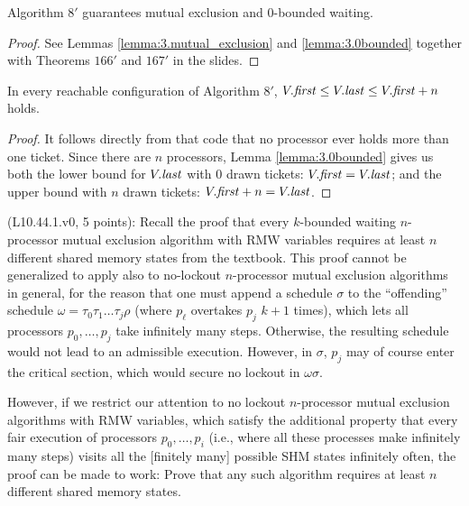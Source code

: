 
\begin{theorem}
Algorithm $8'$ guarantees mutual exclusion and 0-bounded waiting.
\end{theorem}

\begin{proof}
See Lemmas \ref{lemma:3.mutual_exclusion} and \ref{lemma:3.0bounded} together with
Theorems $166'$ and $167'$ in the slides.
\end{proof}


\begin{lemma} \label{lemma:3.Vbounds}
In every reachable configuration of Algorithm $8'$,
$V.\mathit{first} \leq V.\mathit{last} \leq V.\mathit{first}+n$ holds.
\end{lemma}

\begin{proof}
It follows directly from that code that no processor ever holds more than one
ticket. Since there are $n$ processors, Lemma \ref{lemma:3.0bounded} gives us
both the lower bound for $V.\mathit{last}$ with $0$ drawn tickets: $V.\mathit{first} = V.\mathit{last}$;
and the upper bound with $n$ drawn tickets: $V.\mathit{first} + n = V.\mathit{last}$.
\end{proof}



\begin{Exc}{(L10.44.1.v0, 5 points):}
Recall the proof that every $k$-bounded waiting $n$-processor mutual exclusion
algorithm with RMW variables requires at least $n$ different shared
memory states from the textbook. This proof cannot be generalized to apply also to no-lockout
$n$-processor mutual exclusion algorithms in general, for the reason that one must
append a schedule $\sigma$ to the ``offending'' schedule $\omega=\tau_0\tau_1\dots\tau_j\rho$
(where $p_{\ell}$ overtakes $p_j$ $k+1$ times), which lets all processors
$p_0,\dots,p_j$ take infinitely many steps. Otherwise, the resulting schedule
would not lead to an admissible execution. However, in $\sigma$, $p_j$ may of course enter the
critical section, which would secure no lockout in $\omega\sigma$.

However, if we restrict our attention to no lockout $n$-processor
mutual exclusion algorithms with RMW variables, which satisfy the additional
property that every fair execution of processors $p_0,\dots,p_i$
(i.e., where all these processes make infinitely many steps)
visits all the [finitely many] possible SHM states infinitely often,
the proof can be
made to work: Prove that any such algorithm requires at least $n$
different shared memory states.
\end{Exc}

